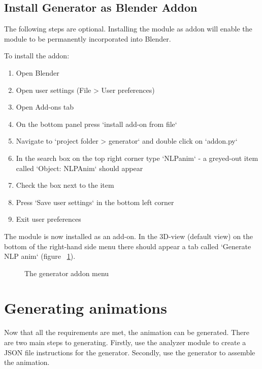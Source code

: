 \subsection{Install Generator as Blender Addon \label{sec:installaddon}}
The following steps are optional. Installing the module as addon will enable the module to be permanently incorporated into Blender.

\noindent To install the addon:
\begin{enumerate}
	\item Open Blender
	\item Open user settings (File > User preferences)
	\item Open Add-ons tab
	\item On the bottom panel press `install add-on from file`
	\item Navigate to `project folder > generator` and double click on `addon.py`
	\item In the search box on the top right corner type `NLPanim` - a greyed-out item called `Object: NLPAnim` should appear
	\item Check the box next to the item
	\item Press `Save user settings` in the bottom left corner
	\item Exit user preferences
\end{enumerate}

\noindent The module is now installed as an add-on. In the 3D-view (default view) on the bottom of the right-hand side menu there should appear a tab called `Generate NLP anim` (figure ~\ref{fig:installedaddon}).
	
\begin{figure}[!ht]
	\centerline{}
	\caption{The generator addon menu}\label{fig:installedaddon}
\end{figure}

\section{Generating animations \label{sec:generatormanual}}
\noindent Now that all the requirements are met, the animation can be generated. There are two main steps to generating. Firstly, use the analyzer module to create a JSON file instructions for the generator. Secondly, use the generator to assemble the animation.

